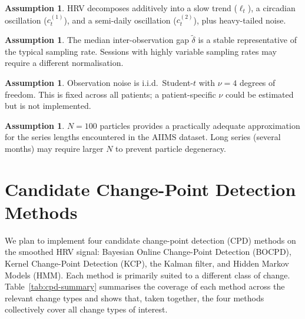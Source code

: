 \documentclass[11pt, a4paper]{article}
\theoremstyle{plain}
\theoremstyle{definition}
\newtheorem{assumption}[theorem]{Assumption}
\begin{document}
\begin{assumption}
HRV decomposes additively into a slow trend ($\ell_t$), a circadian
oscillation ($c_t^{(1)}$), and a semi-daily oscillation ($c_t^{(2)}$), plus
heavy-tailed noise.
\end{assumption}

\begin{assumption}
The median inter-observation gap $\tilde\delta$ is a stable representative
of the typical sampling rate. Sessions with highly variable sampling rates
may require a different normalisation.
\end{assumption}

\begin{assumption}
Observation noise is i.i.d.\ Student-$t$ with $\nu = 4$ degrees of freedom.
This is fixed across all patients; a patient-specific $\nu$ could be estimated
but is not implemented.
\end{assumption}

\begin{assumption}
$N = 100$ particles provides a practically adequate approximation for the
series lengths encountered in the AIIMS dataset. Long series (several months)
may require larger $N$ to prevent particle degeneracy.
\end{assumption}

\section{Candidate Change-Point Detection Methods}

We plan to implement four candidate change-point detection (CPD) methods on
the smoothed HRV signal: Bayesian Online Change-Point Detection (BOCPD),
Kernel Change-Point Detection (KCP), the Kalman filter, and Hidden Markov
Models (HMM). Each method is primarily suited to a different class of
change. Table~\ref{tab:cpd-summary} summarises the coverage of each method
across the relevant change types and shows that, taken together, the four
methods collectively cover all change types of interest.
\end{document}
